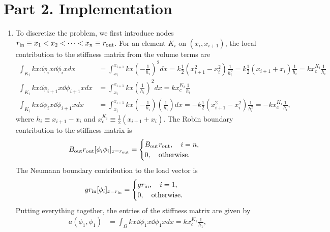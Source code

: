 \documentclass[preprint,11pt]{article}
\begin{document}
\section*{Part 2. Implementation}
\begin{enumerate}
\item To discretize the problem, we first introduce nodes $r_{\rm in} \equiv x_1 < x_2 < \cdots < x_n \equiv r_{\rm out}$.  For an element $K_i$ on $(x_i,x_{i+1})$, the local contribution to the stiffness matrix from the volume terms are
  \begin{align*}
     \int_{K_i} kx \dd{\phi_i}{x} \dd{\phi_i}{x} dx
     &= \int_{x_i}^{x_{i+1}} k x (-\frac{1}{h_i})^2 dx
     = k \frac{1}{2} ( x_{i+1}^2 - x_i^2 ) \frac{1}{h_i^2}
     = k \frac{1}{2} (x_{i+1} + x_i) \frac{1}{h_i}
     = k x^{K_i}_c \frac{1}{h_i}
     \\
     \int_{K_i} kx \dd{\phi_{i+1}}{x} \dd{\phi_{i+1}}{x} dx
     &= \int_{x_i}^{x_{i+1}} k x (\frac{1}{h_i})^2 dx
     = k x^{K_i}_c \frac{1}{h_i}
     \\
     \int_{K_i} kx \dd{\phi_i}{x} \dd{\phi_{i+1}}{x} dx
     &= \int_{x_i}^{x_{i+1}} k x (-\frac{1}{h_i})(\frac{1}{h_i}) dx
     = - k \frac{1}{2} ( x_{i+1}^2 - x_i^2 ) \frac{1}{h_i^2}
     = - k x_c^{K_i} \frac{1}{h_i},
  \end{align*}
  where $h_{i} \equiv x_{i+1} - x_i$ and $x^{K_i}_c \equiv \frac{1}{2} (x_{i+1} + x_i)$. The Robin boundary contribution to the stiffness matrix is
  \begin{equation*}
    B_{\rm out} r_{\rm out} [\phi_i \phi_i]_{x = r_{\rm out}} = \begin{cases}
      B_{\rm out} r_{\rm out}, \quad i = n, \\
      0 , \quad \text{otherwise}.
    \end{cases}
  \end{equation*}
  The Neumann boundary contribution to the load vector is
  \begin{equation*}
    g r_{\rm in} [\phi_i ]_{x = r_{\rm in}} = \begin{cases}
      g r_{\rm in}, \quad i = 1, \\
      0 , \quad \text{otherwise}.
    \end{cases}
  \end{equation*}
  Putting everything together, the entries of the stiffness matrix are given by
  \begin{align*}
    a(\phi_1,\phi_1) &= \int_\Omega kx \dd{\phi_1}{x}  \dd{\phi_1}{x} dx = kx_c^{K_1} \frac{1}{h_1}, \\

\end{align*}
\end{enumerate}
\end{document}
